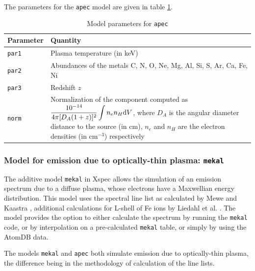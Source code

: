 				The parameters for the \texttt{apec} model are given in table \ref{param:apec}.
				\begin{table}[h!]
					\centering
					\caption{Model parameters for \texttt{apec}}
					\label{param:apec}
					\begin{tabular}{|p{3cm}|p{10cm}|}
						\hline
						\textbf{Parameter} & \textbf{Quantity} \\ \hline
						{\texttt{par1}} & {Plasma temperature (in keV)} \\ \hline
						{\texttt{par2}} & {Abundances of the metals C, N, O, Ne, Mg, Al, Si, S, Ar, Ca, Fe, Ni} \\ \hline
						{\texttt{par3}} & {Redshift $z$} \\ \hline
						{\texttt{norm}} & {Normalization of the component computed as $\displaystyle\dfrac{10^{-14}}{4\pi[D_A(1+z)]^2}\int{n_en_H\mathrm{d}V}$, where $D_A$ is the angular diameter distance to the source (in cm), $n_e$ and $n_H$ are the electron densities (in cm$^{-3}$) respectively} \\ \hline
					\end{tabular}
				\end{table}

			\subsubsection{Model for emission due to optically-thin plasma: \texttt{mekal}}
				The additive model \texttt{mekal} in Xspec allows the simulation of an emission spectrum due to a diffuse plasma, whose electrons have a Maxwellian energy distribution. This model uses the spectral line list as calculated by Mewe and Kaastra \cite{meka}, additional calculations for L-shell of Fe ions by Liedahl et al. \cite{liedahl}. The model provides the option to either calculate the spectrum by running the \texttt{mekal} code, or by interpolation on a pre-calculated \texttt{mekal} table, or simply by using the AtomDB data.
				
				The models \texttt{mekal} and \texttt{apec} both simulate emission due to optically-thin plasma, the difference being in the methodology of calculation of the line lists.
				
